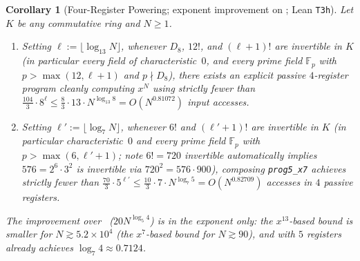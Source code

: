 \documentclass[11pt,reqno]{amsart}
\newtheorem{corollary}[theorem]{Corollary}
\theoremstyle{definition}
\newcommand{\F}{\mathbb{F}}
\begin{document}
\begin{corollary}[Four-Register Powering; exponent improvement on {\cite[Corollary~4.3.1]{Vinciguerra2026}}; Lean \texttt{T3h}]
\label{cor:powering}
Let $K$ be any commutative ring and $N \ge 1$.
\begin{enumerate}
  \item Setting $\ell := \lfloor \log_{13} N \rfloor$, whenever $D_8$, $12!$, and $(\ell + 1)!$ are invertible in $K$ (in particular every field of characteristic~$0$, and every prime field $\F_p$ with $p > \max(12, \ell + 1)$ and $p \nmid D_8$), there exists an explicit passive $4$-register program cleanly computing $x^N$ using strictly fewer than $\frac{104}{3} \cdot 8^\ell \le \frac{8}{3} \cdot 13 \cdot N^{\log_{13} 8} = O(N^{0.81072})$ input accesses.
  \item Setting $\ell' := \lfloor \log_7 N \rfloor$, whenever $6!$ and $(\ell' + 1)!$ are invertible in $K$ (in particular characteristic~$0$ and every prime field $\F_p$ with $p > \max(6, \ell' + 1)$; note $6! = 720$ invertible automatically implies $576 = 2^6 \cdot 3^2$ is invertible via $720^2 = 576 \cdot 900$), composing \texttt{prog5\_x7} achieves strictly fewer than $\frac{70}{3} \cdot 5^{\ell'} \le \frac{10}{3} \cdot 7 \cdot N^{\log_7 5} = O(N^{0.82709})$ accesses in $4$ passive registers.
\end{enumerate}
The improvement over~\cite[Cor.~4.3.1]{Vinciguerra2026} ($20 N^{\log_5 4}$) is in the exponent only: the $x^{13}$-based bound is smaller for $N \gtrsim 5.2 \times 10^4$ (the $x^7$-based bound for $N \gtrsim 90$), and with $5$ registers~\cite[Cor.~4.3.1]{Vinciguerra2026} already achieves $\log_7 4 \approx 0.7124$.
\end{corollary}
\end{document}
